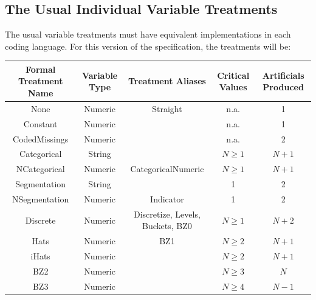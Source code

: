 \documentclass[10pt]{article}
\begin{document}



\subsection{The Usual Individual Variable Treatments}

The usual variable treatments must have equivalent implementations in each coding language. For this version of the 
specification, the treatments will be:

\noindent
\begin{tabular}{|c|c|c|c|c|}\hline
    Formal Treatment Name & Variable Type & Treatment Aliases & Critical Values & Artificials Produced \tallstrut \\ \hline
    None & Numeric   & Straight & n.a. & 1 \tallstrut \\ \hline
    Constant & Numeric   &  & n.a. & 1 \tallstrut \\ \hline
    CodedMissings & Numeric & & n.a. & 2 \tallstrut \\ \hline
    Categorical & String & & $N \ge 1$ & $N+1$ \tallstrut \\ \hline
    NCategorical & Numeric & CategoricalNumeric  & $N \ge 1$ & $N+1$ \tallstrut \\ \hline
    Segmentation & String & & 1 & 2 \tallstrut \\ \hline
    NSegmentation & Numeric & Indicator & 1 & 2 \tallstrut \\ \hline
    Discrete & Numeric & Discretize, Levels, Buckets, BZ0 & $N \ge 1$ & $N+2$ \tallstrut \\ \hline
    Hats & Numeric & BZ1 & $N \ge 2$ & $N+1$ \tallstrut \\ \hline
    iHats & Numeric &  & $N \ge 2$ & $N+1$ \tallstrut \\ \hline
    BZ2 & Numeric &  & $N \ge 3$ & $N$ \tallstrut \\ \hline
    BZ3 & Numeric &  & $N \ge 4$ & $N-1$ \tallstrut \\ \hline
\end{tabular}
\end{document}
